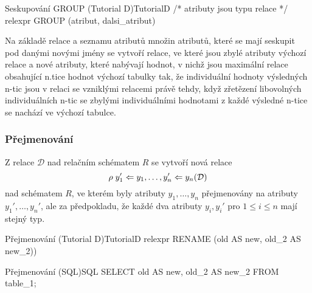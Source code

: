 \begin{upcode}{Seskupování GROUP (Tutorial D)}{}{TutorialD}
/* atributy jsou typu relace */
relexpr GROUP (atribut, dalsi_atribut)
\end{upcode}
Na základě relace a seznamu atributů množin atributů, které se mají seskupit pod danými novými jmény se vytvoří relace, ve které jsou zbylé atributy výchozí relace a nové atributy, které nabývají hodnot, v nichž jsou maximální relace obsahující n.tice hodnot výchozí tabulky tak, že individuální hodnoty výsledných n-tic jsou v relaci se vzniklými relacemi právě tehdy, když zřetězení libovolných individuálních n-tic se zbylými individuálními hodnotami z každé výsledné n-tice se nachází ve výchozí tabulce.

\subsubsection{Přejmenování}
Z relace $\mathcal{D}$ nad relačním schématem $R$ se vytvoří nová relace
$$
\rho \thickspace y_{1}' \Leftarrow y_{1}, \ldots, y_{n}' \Leftarrow y_{n} (\mathcal{D})
$$
nad schématem $R$, ve kterém byly atributy $y_{1}, \ldots, y_{n}$ přejmenovány na atributy $y_{1}', \ldots, y_{n}'$, ale za předpokladu, že každé dva atributy $y_{i}, y_{i}' \text{ pro } 1 \leq i \leq n$ mají stejný typ.
\begin{upcode}{Přejmenování (Tutorial D)}{}{TutorialD}
relexpr RENAME (old AS new, old_2 AS new_2))
\end{upcode}
\begin{upcode}{Přejmenování (SQL)}{}{SQL}
SELECT old AS new, old_2 AS new_2 FROM table_1;
\end{upcode}

